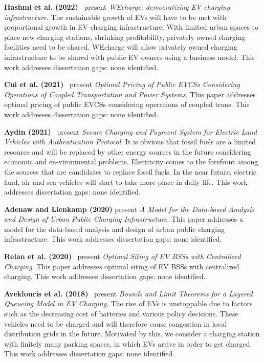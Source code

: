 \documentclass[letterpaper, 12pt, oneside, doublespacing]{Thesis}
\begin{document}
\noindent \textbf{Hashmi et al. (2022)}~\cite{wecharge_democratizing_2022} present \textit{WEcharge: democratizing EV charging infrastructure}. The sustainable growth of EVs will have to be met with proportional growth in EV charging infrastructure. With limited urban spaces to place new charging stations, shrinking profitability, privately owned charging facilities need to be shared. WEcharge will allow privately owned charging infrastructure to be shared with public EV owners using a business model. This work addresses dissertation gaps: none identified.



\noindent \textbf{Cui et al. (2021)}~\cite{optimal_pricing_2021} present \textit{Optimal Pricing of Public EVCSs Considering Operations of Coupled Transportation and Power Systems}. This paper addresses optimal pricing of public EVCSs considering operations of coupled trans. This work addresses dissertation gaps: none identified.



\noindent \textbf{Aydin (2021)}~\cite{secure_charging_2021} present \textit{Secure Charging and Payment System for Electric Land Vehicles with Authentication Protocol}. It is obvious that fossil fuels are a limited resource and will be replaced by other energy sources in the future considering economic and en-vironmental problems. Electricity comes to the forefront among the sources that are candidates to replace fossil fuels. In the near future, electric land, air and sea vehicles will start to take more place in daily life. This work addresses dissertation gaps: none identified.



\noindent \textbf{Adenaw and Lienkamp (2020)} present \textit{A Model for the Data-based Analysis and Design of Urban Public Charging Infrastructure}. This paper addresses a model for the data-based analysis and design of urban public charging infrastructure. This work addresses dissertation gaps: none identified.



\noindent \textbf{Relan et al. (2020)}~\cite{optimal_siting_2020} present \textit{Optimal Siting of EV BSSs with Centralized Charging}. This paper addresses optimal siting of EV BSSs with centralized charging. This work addresses dissertation gaps: none identified.



\noindent \textbf{Aveklouris et al. (2018)}~\cite{bounds_and_2018} present \textit{Bounds and Limit Theorems for a Layered Queueing Model in EV Charging}. The rise of EVs is unstoppable due to factors such as the decreasing cost of batteries and various policy decisions. These vehicles need to be charged and will therefore cause congestion in local distribution grids in the future. Motivated by this, we consider a charging station with finitely many parking spaces, in which EVs arrive in order to get charged. This work addresses dissertation gaps: none identified.
\end{document}

